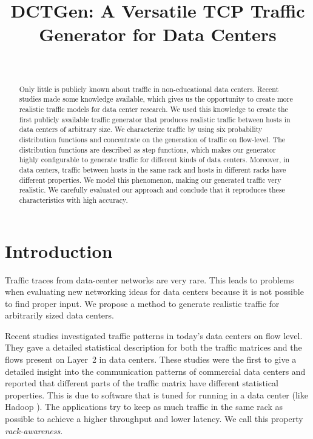 \documentclass[journal,10pt]{IEEEtran}
\newcommand{\genname}{DCTGen}
\begin{document}
\title{\genname{}: A Versatile TCP Traffic Generator for Data Centers}
\author{\\
}

\maketitle

\begin{abstract}
	Only little is publicly known about traffic in non-educational data centers.
	Recent studies made some knowledge available, which gives us the opportunity to create more realistic traffic models for
	data center research.
	We used this knowledge to create the first publicly available traffic generator that produces realistic traffic between hosts in 
	data centers of arbitrary size.
	We characterize traffic by using six probability distribution functions and concentrate on the generation 
	of traffic on flow-level.
	The distribution functions are described as step functions, which makes our generator highly configurable 
	to generate traffic for different kinds of data centers.
	Moreover, in data centers,
	traffic between hosts in the same rack and hosts in different racks have different properties.
	We model this phenomenon, making our generated traffic very realistic.	
	We carefully evaluated our approach and conclude that it reproduces these characteristics with high accuracy.
	
	
	


\end{abstract}


\section{Introduction}


Traffic traces from data-center networks are very rare. This leads to problems when evaluating new networking ideas for data centers because
it is not possible to find proper input. 
We propose a method to generate realistic traffic for arbitrarily sized data centers.

Recent studies \cite{MSR-datacenters, datacentersInTheWild} investigated traffic patterns in today's data centers on flow level.
They gave a detailed statistical description for both the traffic matrices and the flows present on Layer~2 in data centers.
These studies were the first to give a detailed insight into the communication patterns of commercial data centers
and reported that different parts of the traffic matrix have different statistical properties. 
This is due to 
software that is tuned for running in a data center (like Hadoop \cite{hadoop}). The applications try to keep as much traffic in the same rack as possible
to achieve a higher throughput and lower latency. We call this property \emph{rack-awareness}.
\end{document}
